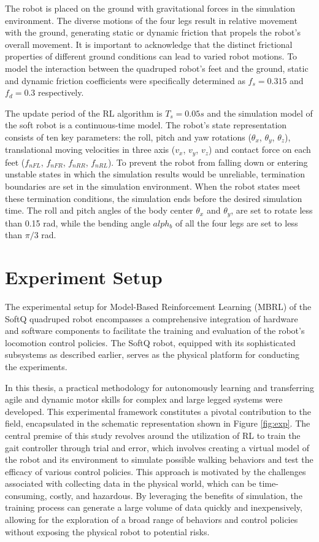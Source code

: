The robot is placed on the ground with gravitational forces in the simulation environment. The diverse motions of the four legs result in relative movement with the ground, generating static or dynamic friction that propels the robot's overall movement. It is important to acknowledge that the distinct frictional properties of different ground conditions can lead to varied robot motions. To model the interaction between the quadruped robot's feet and the ground, static and dynamic friction coefficients were specifically determined as $f_s = 0.315$ and $f_d = 0.3$ respectively.

The update period of the RL algorithm is $T_s = 0.05s$ and the simulation model of the soft robot is a continuous-time model. The robot's state representation consists of ten key parameters: the roll, pitch and yaw rotations ($\theta_x$, $\theta_y$, $\theta_z$), translational moving velocities in three axis ($v_x$, $v_y$, $v_z$) and contact force on each feet ($f_{nFL}$, $f_{nFR}$, $f_{nRR}$, $f_{nRL}$). To prevent the robot from falling down or entering unstable states in which the simulation results would be unreliable, termination boundaries are set in the simulation environment. When the robot states meet these termination conditions, the simulation ends before the desired simulation time. The roll and pitch angles of the body center $\theta_x$ and $\theta_y$, are set to rotate less than 0.15 rad, while the bending angle $alph_b$ of all the four legs are set to less than $\pi/3$ rad. 

\section{Experiment Setup}
The experimental setup for Model-Based Reinforcement Learning (MBRL) of the SoftQ quadruped robot encompasses a comprehensive integration of hardware and software components to facilitate the training and evaluation of the robot's locomotion control policies. The SoftQ robot, equipped with its sophisticated subsystems as described earlier, serves as the physical platform for conducting the experiments. 



In this thesis, a practical methodology for autonomously learning and transferring agile and dynamic motor skills for complex and large legged systems were developed. This experimental framework constitutes a pivotal contribution to the field, encapsulated in the schematic representation shown in Figure \ref{fig:exp}. The central premise of this study revolves around the utilization of \ac{RL} to train the gait controller through trial and error, which involves creating a virtual model of the robot and its environment to simulate possible walking behaviors and test the efficacy of various control policies. This approach is motivated by the challenges associated with collecting data in the physical world, which can be time-consuming, costly, and hazardous. By leveraging the benefits of simulation, the training process can generate a large volume of data quickly and inexpensively, allowing for the exploration of a broad range of behaviors and control policies without exposing the physical robot to potential risks.


